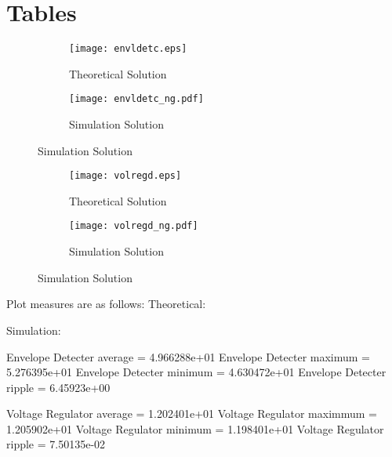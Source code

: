 \section{Tables}
\label{sec:tables}

\begin{figure}[H]
\centering
\caption{Plots from theoretical and simulation analysis}
\begin{subfigure}{\textwidth}
\centering
\texttt{[image: envldetc.eps]}
\caption{Theoretical Solution}
\end{subfigure}
\begin{subfigure}{\textwidth}
\centering
\texttt{[image: envldetc\_ng.pdf]}
\caption{Simulation Solution}
\end{subfigure}
\end{figure}

\begin{figure}[H]
\centering
\caption{Solution - 12}
\begin{subfigure}{\textwidth}
\centering
\texttt{[image: volregd.eps]}
\caption{Theoretical Solution}
\end{subfigure}
\begin{subfigure}{\textwidth}
\centering
\texttt{[image: volregd\_ng.pdf]}
\caption{Simulation Solution}
\end{subfigure}
\end{figure}

Plot measures are as follows:
Theoretical:

Simulation:

Envelope Detecter average =  4.966288e+01 
Envelope Detecter maximum =  5.276395e+01
Envelope Detecter minimum =  4.630472e+01
Envelope Detecter ripple =  6.45923e+00

Voltage Regulator average =  1.202401e+01
Voltage Regulator maximmum =  1.205902e+01
Voltage Regulator minimum =  1.198401e+01
Voltage Regulator ripple  =  7.50135e-02
